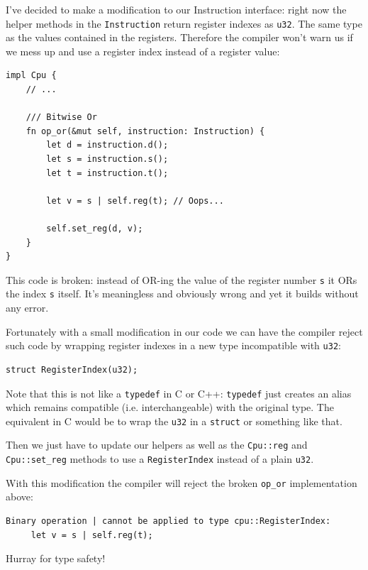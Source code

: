 \documentclass[a4paper]{article}
\newcommand{\code}[1] {\texttt{#1}}
\begin{document}
I've decided to make a modification to our Instruction interface:
right now the helper methods in the \code{Instruction} return
register indexes as \code{u32}. The same type as the values
contained in the registers. Therefore the compiler won't warn us if we
mess up and use a register index instead of a register value:

\begin{lstlisting}
impl Cpu {
    // ...

    /// Bitwise Or
    fn op_or(&mut self, instruction: Instruction) {
        let d = instruction.d();
        let s = instruction.s();
        let t = instruction.t();

        let v = s | self.reg(t); // Oops...

        self.set_reg(d, v);
    }
}
\end{lstlisting}

This code is broken: instead of OR-ing the value of the register
number \code{s} it ORs the index \code{s} itself. It's meaningless
and obviously wrong and yet it builds without any error.

Fortunately with a small modification in our code we can have the
compiler reject such code by wrapping register indexes in a new type
incompatible with \code{u32}:

\begin{lstlisting}
struct RegisterIndex(u32);
\end{lstlisting}

Note that this is not like a \code{typedef} in C or C++:
\code{typedef} just creates an alias which remains compatible
(i.e. interchangeable) with the original type. The equivalent in C
would be to wrap the \code{u32} in a \code{struct} or something like that.

Then we just have to update our helpers as well as the
\code{Cpu::reg} and \code{Cpu::set\_reg} methods to use a
\code{RegisterIndex} instead of a plain \code{u32}.

With this modification the compiler will reject the broken
\code{op\_or} implementation above:

\begin{verbatim}
Binary operation | cannot be applied to type cpu::RegisterIndex:
     let v = s | self.reg(t);
\end{verbatim}

Hurray for type safety!
\end{document}
